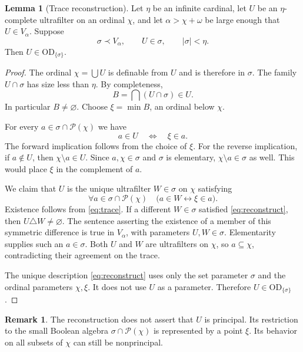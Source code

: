 \documentclass[11pt,letterpaper]{article}
\theoremstyle{definition}
\newtheorem{lemma}[definition]{Lemma}
\newcommand{\OD}{\mathrm{OD}}
\newcommand{\Pow}{\mathcal{P}}
\newtheorem{remark}[definition]{Remark}
\begin{document}
\begin{lemma}[Trace reconstruction]\label{lem:trace}
Let $\eta$ be an infinite cardinal, let $U$ be an $\eta$-complete ultrafilter on an ordinal $\chi$, and let $\alpha>\chi+\omega$ be large enough that $U\in V_\alpha$. Suppose
\[
\sigma\prec V_\alpha,\qquad U\in\sigma,\qquad |\sigma|<\eta.
\]
Then $U\in\OD_{\{\sigma\}}$.
\end{lemma}
\begin{proof}
The ordinal $\chi=\bigcup U$ is definable from $U$ and is therefore in $\sigma$. The family $U\cap\sigma$ has size less than $\eta$. By completeness,
\[
B=\bigcap(U\cap\sigma)\in U.
\]
In particular $B\ne\varnothing$. Choose $\xi=\min B$, an ordinal below $\chi$.

For every $a\in\sigma\cap\Pow(\chi)$ we have
\begin{equation}\label{eq:trace}
a\in U\quad\Longleftrightarrow\quad\xi\in a.
\end{equation}
The forward implication follows from the choice of $\xi$. For the reverse implication, if $a\notin U$, then $\chi\setminus a\in U$. Since $a,\chi\in\sigma$ and $\sigma$ is elementary, $\chi\setminus a\in\sigma$ as well. This would place $\xi$ in the complement of $a$.

We claim that $U$ is the unique ultrafilter $W\in\sigma$ on $\chi$ satisfying
\begin{equation}\label{eq:reconstruct}
\forall a\in\sigma\cap\Pow(\chi)\quad
\bigl(a\in W\longleftrightarrow\xi\in a\bigr).
\end{equation}
Existence follows from \eqref{eq:trace}. If a different $W\in\sigma$ satisfied \eqref{eq:reconstruct}, then $U\triangle W\ne\varnothing$. The sentence asserting the existence of a member of this symmetric difference is true in $V_\alpha$, with parameters $U,W\in\sigma$. Elementarity supplies such an $a\in\sigma$. Both $U$ and $W$ are ultrafilters on $\chi$, so $a\subseteq\chi$, contradicting their agreement on the trace.

The unique description \eqref{eq:reconstruct} uses only the set parameter $\sigma$ and the ordinal parameters $\chi,\xi$. It does not use $U$ as a parameter. Therefore $U\in\OD_{\{\sigma\}}$.
\end{proof}

\begin{remark}
The reconstruction does not assert that $U$ is principal. Its restriction to the small Boolean algebra $\sigma\cap\Pow(\chi)$ is represented by a point $\xi$. Its behavior on all subsets of $\chi$ can still be nonprincipal.
\end{remark}
\end{document}
